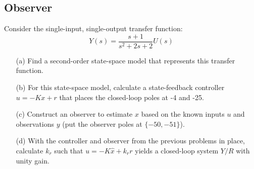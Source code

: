 \documentclass[12pt]{article}
\begin{document}
\clearpage
\subsection{Observer}

Consider the single-input, single-output transfer function:
$$
Y(s)=\frac{s+1}{s^2+2 s+2} U(s)
$$
\begin{itemize}
    \item [(a)] Find a second-order state-space model that represents this transfer function.
    \item [(b)] For this state-space model, calculate a state-feedback controller $u=-K x+r$ that places the closed-loop poles at -4 and -25.
    \item [(c)] Construct an observer to estimate $x$ based on the known inputs $u$ and observations $y$ (put the observer poles at $\{-50,-51\}$).
    \item [(d)] With the controller and observer from the previous problems in place, calculate $k_r$ such that $u=-K \hat{x}+k_r r$ yields a closed-loop system $Y / R$ with unity gain.
\end{itemize}
\end{document}
